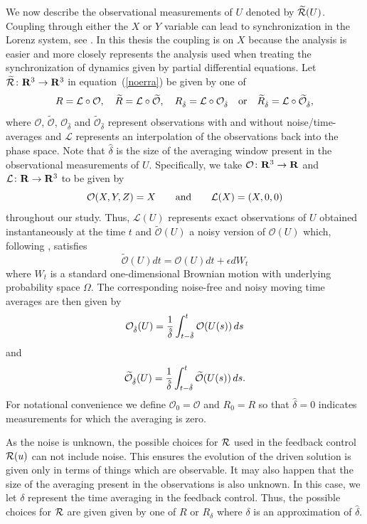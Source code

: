 \documentclass[master,tocprelim,12pt]{unrthesis}
\theoremstyle{definition}
\newcommand{\cO}{{\mathcal O}}
\newcommand{\R}{{\bf R}}
\newcommand{\cL}{{\mathcal L}}
\def\words#1{\quad\hbox{#1}\quad}
\def\wwords#1{\qquad\hbox{#1}\qquad}
\numberwithin{equation}{chapter}
\begin{document}
\begin{manuscript}
We now describe the observational measurements of $U$
denoted by $\widetilde{\cal R}(U)$.
Coupling through either the $X$ or $Y$ variable can lead to 
synchronization in the Lorenz system, see \cite{HaydenThesis}.
In this thesis the coupling is on $X$ because the analysis is 
easier and more closely 
represents the analysis used when treating the synchronization
of dynamics given by partial differential equations.
Let 
$\widetilde {\cal R}\colon \R^3\to \R^3$ in equation~(\ref{noerra}) be given 
by one of
$$
R=\cL\circ \cO,\quad
\widetilde R=\cL\circ \widetilde \cO
,\quad
R_{\hat\delta}=\cL\circ \cO_{\hat\delta}
\words{or}
\widetilde R_{\hat\delta}=\cL\circ \widetilde \cO_{\hat\delta},
$$ 
where $\cO$, $\widetilde\cO$, $\cO_{\hat\delta}$ and 
$\widetilde\cO_{\hat\delta}$
represent 
observations with and without noise/time-averages
and
$\cL$
represents an interpolation of the observations 
back into the phase space.
Note that $\hat\delta$ is the size of the averaging window
present in the observational measurements of $U$.
Specifically, we take $\cO\colon \R^3 \rightarrow \R$
and $\cL\colon\R\to\R^3$ 
to be given by 
\begin{equation}\label{Lobserve}
\cO(X,Y,Z)=X\wwords{and} \cL(X)=(X,0,0)
\end{equation}
throughout our study.
Thus, $\cL(U)$ represents exact observations 
of $U$ obtained instantaneously at the time $t$ 
and $\widetilde\cO(U)$ a noisy version of $\cO(U)$ 
which, following \cite{Bessaih15}, satisfies
\begin{equation}\label{tildecO}
\widetilde\cO(U)dt
	=\cO(U)dt+\epsilon dW_t
\end{equation}
where $W_t$ is a standard one-dimensional Brownian motion
with underlying probability space $\Omega$.
The corresponding noise-free and noisy moving time averages
are then given 
by 
\begin{equation}\label{cOdelta}\cO_{\hat\delta}(U)
	={1\over\hat\delta}\int_{t-\hat\delta}^t \cO(U(s))\,ds
\end{equation}
and
\begin{equation}\label{tildecOdelta}
\widetilde\cO_{\hat\delta}(U)
	={1\over\hat\delta}\int_{t-\hat\delta}^t \widetilde\cO(U(s))\,ds.
\end{equation}
For notational convenience we define 
$\cO_0=\cO$ and $R_0=R$ so that $\hat\delta=0$ indicates measurements 
for which the averaging is zero.

As the noise is unknown, the possible choices for ${\cal R}$
used in the feedback control ${\cal R}(u)$ can not include
noise.
This ensures the evolution of the driven solution is given
only in terms of things which are observable.
It may also happen that the size of the averaging present in 
the observations is also unknown. 
In this case, we let $\delta$ represent the time 
averaging in the feedback control.
Thus,
the possible choices for ${\cal R}$ are given given by 
one of $R$ or $R_{\delta}$ where $\delta$ is an approximation
of $\hat\delta$.


\end{manuscript}
\end{document}
